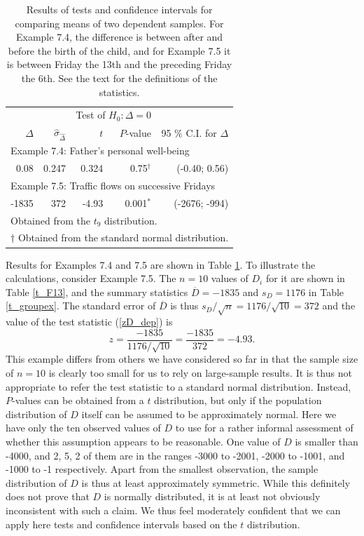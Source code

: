 \begin{table}
\caption{Results of tests and confidence intervals for comparing
means of two dependent samples. For Example 7.4, the difference
is between after and before the birth of the child, and
for Example 7.5 it is between Friday the 13th and the preceding Friday
the 6th.
See the text for the
definitions of the statistics.}
\label{t_2tests_dep}

\begin{center}
\begin{tabular}{|rrrrr|}\hline
& & \multicolumn{2}{r}{Test of $H_{0}: \Delta=0$} & \\
$\hat{\Delta}$& $\hat{\sigma}_{\hat{\Delta}}$& $t$ & $P$-value &
95 \% C.I. for $\Delta$ \\ \hline
\multicolumn{5}{|l|}{Example 7.4: Father's personal well-being}\\[.7ex]
0.08 & 0.247 & 0.324 & 0.75$^{\dagger}$ & (-0.40; 0.56) \\[1ex]
\hline
\multicolumn{5}{|l|}{Example 7.5: Traffic flows on successive
Fridays}\\[.7ex]
-1835 & 372 & -4.93 & 0.001$^{*}$ & (-2676; -994) \\
\hline
\multicolumn{5}{l}{{\footnotesize * Obtained from the $t_{9}$
distribution.}}\\
\multicolumn{5}{l}{{\footnotesize $\dagger$ Obtained from the
standard normal distribution.}}
\end{tabular}
\end{center}
\end{table}


Results for Examples 7.4 and 7.5 are shown in Table
\ref{t_2tests_dep}. To illustrate the calculations, consider Example
7.5. The $n=10$ values of $D_{i}$ for it are shown in Table \ref{t_F13},
and the summary statistics $\overline{D}=-1835$ and $s_{D}=1176$ in
Table \ref{t_groupex}. The standard error of $\overline{D}$ is thus
$s_{D}/\sqrt{n}=1176/\sqrt{10}=372$ and the value of the test
statistic (\ref{zD_dep}) is
\[
z=\frac{-1835}{1176/\sqrt{10}}=\frac{-1835}{372}=-4.93.
\]
This example differs from others we have considered so far in that the
sample size of $n=10$ is clearly too small for us to rely on
large-sample results. It is thus not appropriate to
refer the test statistic to a standard normal
distribution. Instead, $P$-values can be obtained from a
$t$ distribution, but only if the population distribution of $D$ itself
can be assumed to  be approximately normal. Here we have only
the ten observed values of $D$ to use for a rather informal assessment
of whether this assumption appears to be reasonable. One value of $D$ is
smaller than -4000, and 2, 5, 2 of them are in the ranges -3000 to
-2001, -2000 to -1001, and -1000 to -1 respectively. Apart from the
smallest observation, the sample distribution of $D$ is thus at least
approximately symmetric. While this definitely does not prove that $D$
is normally distributed, it is at least not obviously inconsistent with
such a claim. We thus feel moderately confident that we can apply here
tests
and confidence intervals based on the $t$ distribution.

